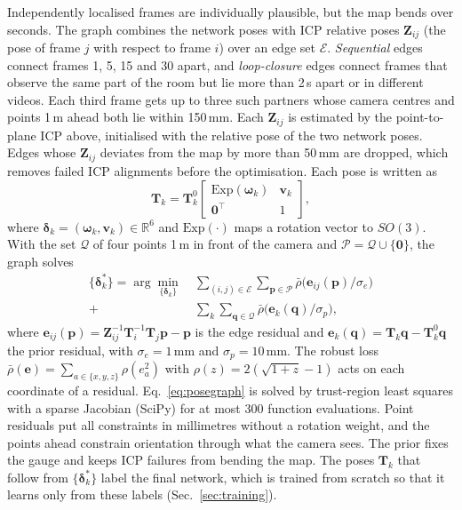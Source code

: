 \documentclass[9pt,shortpaper,twoside,web]{ieeecolor2}
\begin{document}
Independently localised frames are individually plausible, but the map bends over seconds. The graph combines the network poses with ICP relative poses $\mathbf{Z}_{ij}$ (the pose of frame $j$ with respect to frame $i$) over an edge set $\mathcal{E}$. \emph{Sequential} edges connect frames 1, 5, 15 and 30 apart, and \emph{loop-closure} edges connect frames that observe the same part of the room but lie more than 2\,s apart or in different videos. Each third frame gets up to three such partners whose camera centres and points 1\,m ahead both lie within 150\,mm. Each $\mathbf{Z}_{ij}$ is estimated by the point-to-plane ICP above, initialised with the relative pose of the two network poses. Edges whose $\mathbf{Z}_{ij}$ deviates from the map by more than 50\,mm are dropped, which removes failed ICP alignments before the optimisation. Each pose is written as 
\begin{equation}
\mathbf{T}_k=\mathbf{T}^0_k\begin{bmatrix}\mathrm{Exp}(\boldsymbol{\omega}_k)&\mathbf{v}_k\\\mathbf{0}^\top&1\end{bmatrix},
  \label{eq:param}
\end{equation}
where $\boldsymbol{\delta}_k=(\boldsymbol{\omega}_k,\mathbf{v}_k)\in\mathbb{R}^6$ and $\mathrm{Exp}(\cdot)$ maps a rotation vector to $SO(3)$. With the set $\mathcal{Q}$ of four points 1\,m in front of the camera and $\mathcal{P}=\mathcal{Q}\cup\{\mathbf{0}\}$, the graph solves
\begin{equation}
  \begin{aligned}
  \{\boldsymbol{\delta}_k^\ast\}=\arg\min_{\{\boldsymbol{\delta}_k\}}\ &\sum_{(i,j)\in\mathcal{E}}\sum_{\mathbf{p}\in\mathcal{P}}\bar{\rho}\big(\mathbf{e}_{ij}(\mathbf{p})/\sigma_e\big)\\
  +&\sum_{k}\sum_{\mathbf{q}\in\mathcal{Q}}\bar{\rho}\big(\mathbf{e}_{k}(\mathbf{q})/\sigma_p\big),
  \end{aligned}
  \label{eq:posegraph}
\end{equation}
where $\mathbf{e}_{ij}(\mathbf{p})=\mathbf{Z}_{ij}^{-1}\mathbf{T}_i^{-1}\mathbf{T}_j\mathbf{p}-\mathbf{p}$ is the edge residual and $\mathbf{e}_k(\mathbf{q})=\mathbf{T}_k\mathbf{q}-\mathbf{T}^0_k\mathbf{q}$ the prior residual, with $\sigma_e=1$\,mm and $\sigma_p=10$\,mm. The robust loss $\bar{\rho}(\mathbf{e})=\sum_{a\in\{x,y,z\}}\rho(e_a^2)$ with $\rho(z)=2(\sqrt{1+z}-1)$ acts on each coordinate of a residual. Eq.~\eqref{eq:posegraph} is solved by trust-region least squares with a sparse Jacobian (SciPy) for at most 300 function evaluations. Point residuals put all constraints in millimetres without a rotation weight, and the points ahead constrain orientation through what the camera sees. The prior fixes the gauge and keeps ICP failures from bending the map. The poses $\mathbf{T}_k$ that follow from $\{\boldsymbol{\delta}^\ast_k\}$ label the final network, which is trained from scratch so that it learns only from these labels (Sec.~\ref{sec:training}).
\end{document}

